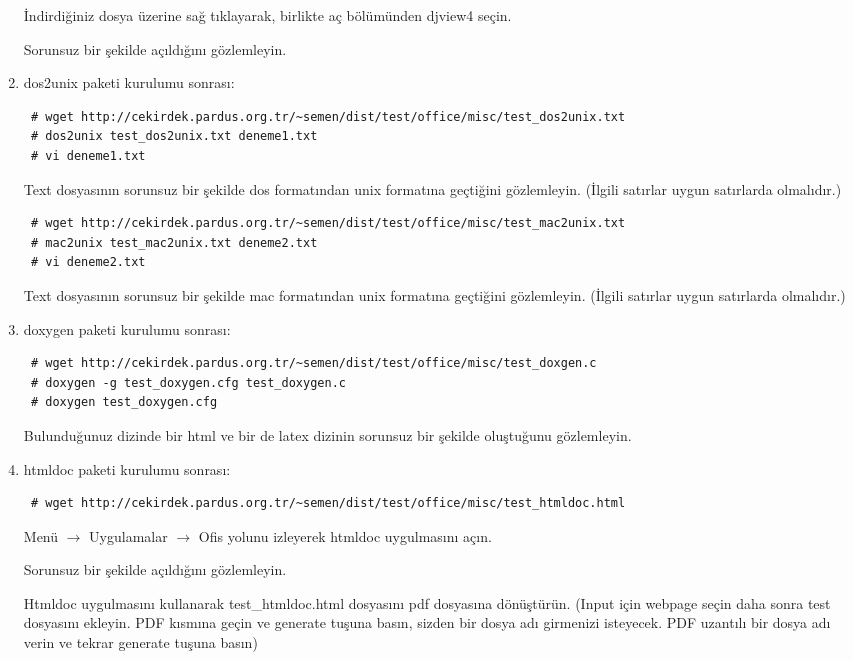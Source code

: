 \documentclass[a4paper,10pt]{article}
\begin{document}
\begin{enumerate}
İndirdiğiniz dosya üzerine sağ tıklayarak, birlikte aç bölümünden djview4 seçin. 

Sorunsuz bir şekilde açıldığını gözlemleyin.

\item dos2unix paketi kurulumu sonrası:
\begin{verbatim}
 # wget http://cekirdek.pardus.org.tr/~semen/dist/test/office/misc/test_dos2unix.txt
 # dos2unix test_dos2unix.txt deneme1.txt
 # vi deneme1.txt
\end{verbatim}
Text dosyasının sorunsuz bir şekilde dos formatından unix formatına geçtiğini gözlemleyin. (İlgili satırlar uygun satırlarda olmalıdır.)

\begin{verbatim}
 # wget http://cekirdek.pardus.org.tr/~semen/dist/test/office/misc/test_mac2unix.txt
 # mac2unix test_mac2unix.txt deneme2.txt
 # vi deneme2.txt
\end{verbatim}
Text dosyasının sorunsuz bir şekilde mac formatından unix formatına geçtiğini gözlemleyin. (İlgili satırlar uygun satırlarda olmalıdır.)

\item doxygen paketi kurulumu sonrası:
\begin{verbatim}
 # wget http://cekirdek.pardus.org.tr/~semen/dist/test/office/misc/test_doxgen.c
 # doxygen -g test_doxygen.cfg test_doxygen.c
 # doxygen test_doxygen.cfg
\end{verbatim}

Bulunduğunuz dizinde bir html ve bir de latex dizinin sorunsuz bir şekilde oluştuğunu gözlemleyin.

\item htmldoc paketi kurulumu sonrası:
\begin{verbatim}
 # wget http://cekirdek.pardus.org.tr/~semen/dist/test/office/misc/test_htmldoc.html
\end{verbatim}

Menü $\rightarrow$ Uygulamalar $\rightarrow$ Ofis yolunu izleyerek htmldoc uygulmasını açın.

Sorunsuz bir şekilde açıldığını gözlemleyin.

Htmldoc uygulmasını kullanarak test\_htmldoc.html dosyasını pdf dosyasına dönüştürün. (Input için webpage seçin daha sonra test dosyasını ekleyin. PDF kısmına geçin ve generate tuşuna basın, sizden bir dosya adı girmenizi isteyecek. PDF uzantılı bir dosya adı verin ve tekrar generate tuşuna basın)
 

\end{enumerate}
\end{document}
